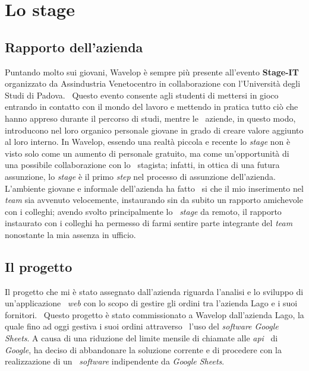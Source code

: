 
\chapter{Lo stage}
\label{cap:stage}
\section{Rapporto dell'azienda}
Puntando molto sui giovani, Wavelop è sempre più presente all'evento \textbf{Stage-IT} organizzato da Assindustria Venetocentro in collaborazione con l'Università degli Studi di Padova. \
Questo evento consente agli studenti di mettersi in gioco entrando in contatto con il mondo del lavoro e mettendo in pratica tutto ciò che hanno appreso durante il percorso di studi, mentre le \
aziende, in questo modo, introducono nel loro organico personale giovane in grado di creare valore aggiunto al loro interno.
In Wavelop, essendo una realtà piccola e recente lo \emph{stage} non è visto solo come un aumento di personale gratuito, ma come un'opportunità di una possibile collaborazione con lo \
stagista; infatti, in ottica di una futura assunzione, lo \emph{stage} è il primo \emph{step} nel processo di assunzione dell'azienda. L'ambiente giovane e informale dell'azienda ha fatto \
si che il mio inserimento nel \emph{team} sia avvenuto velocemente, instaurando sin da subito un rapporto amichevole con i colleghi; avendo svolto principalmente lo \
\emph{stage} da remoto, il rapporto instaurato con i colleghi ha permesso di farmi sentire parte integrante del \emph{team} nonostante la mia assenza in ufficio.

\section{Il progetto}
Il progetto che mi è stato assegnato dall'azienda riguarda l'analisi e lo sviluppo di un'applicazione \
\emph{web} con lo scopo di gestire gli ordini tra l'azienda Lago e i suoi fornitori. \ 
Questo progetto è stato commissionato a Wavelop dall'azienda Lago, la quale fino ad oggi gestiva i suoi ordini attraverso \
l'uso del \emph{software Google Sheets}. A causa di una riduzione del limite mensile di chiamate alle \emph{\acrshort{api}} \
di \emph{Google}, ha deciso di abbandonare la soluzione corrente e di procedere con la realizzazione di un \
\emph{software} indipendente da \emph{Google Sheets}. \\

